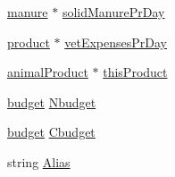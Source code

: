 \begin{DoxyCompactItemize}
\item 
\hyperlink{classmanure}{manure} $\ast$ \hyperlink{classanimal_a33be7bd5359038d124130c3ca62e44ee}{solidManurePrDay}
\item 
\hyperlink{classproduct}{product} $\ast$ \hyperlink{classanimal_adc0a0b3c8cba52e8ffbe39fdf311887a}{vetExpensesPrDay}
\item 
\hyperlink{classanimal_product}{animalProduct} $\ast$ \hyperlink{classanimal_a686e9edfe2ba45e7c160927e618cc3f6}{thisProduct}
\item 
\hyperlink{classbudget}{budget} \hyperlink{classanimal_abdcc86166e02106463ac356ffe91f258}{Nbudget}
\item 
\hyperlink{classbudget}{budget} \hyperlink{classanimal_a628e470a01f24baba08845a760574fa5}{Cbudget}
\item 
string \hyperlink{classanimal_acb5645f84affade5748c1cd8cf28a6f1}{Alias}
\end{DoxyCompactItemize}


